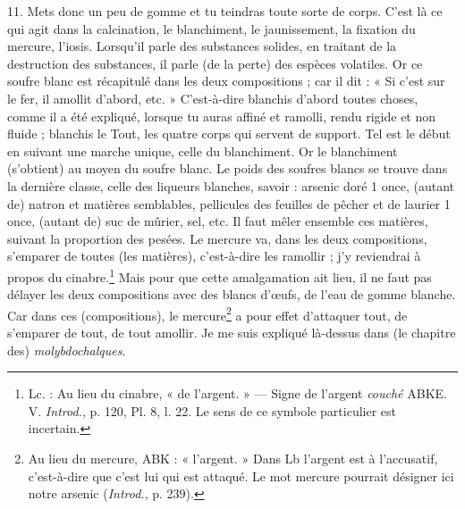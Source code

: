 \documentclass[a4paper, 11pt, oneside, polutonikogreek, french]{article}
\begin{document}
11. Mets donc un peu de gomme et tu teindras toute sorte de corps. C'est là ce qui agit dans la calcination, le blanchiment, le jaunissement, la fixation du mercure, l'iosis. Lorsqu'il parle des substances solides, en traitant de la destruction des substances, il parle (de la perte) des espèces volatiles. Or ce soufre blanc est récapitulé dans les deux compositions ; car il dit : « Si c'est sur le fer, il amollit d'abord, etc. » C'est-à-dire blanchis d'abord toutes choses, comme il a été expliqué, lorsque tu auras affiné et ramolli, rendu rigide et non fluide ; blanchis le Tout, les quatre corps qui servent de support. Tel est le début en suivant une marche unique, celle du blanchiment. Or le blanchiment (s'obtient) au moyen du soufre blanc. Le poids des soufres blancs se trouve dans la dernière classe, celle des liqueurs blanches, savoir : arsenic doré 1 once, (autant de) natron et matières semblables, pellicules des feuilles de pêcher et de laurier 1 once, (autant de) suc de mûrier, sel, etc. Il faut mêler ensemble ces matières, suivant la proportion des pesées. Le mercure va, dans les deux compositions, s'emparer de toutes (les matières), c'est-à-dire les ramollir ; j'y reviendrai à propos du cinabre.\footnote{Lc. : Au lieu du cinabre, « de l'argent. » --- Signe de l'argent \emph{couché} ABKE. V. \emph{Introd.}, p. 120, Pl. 8, l. 22. Le sens de ce symbole particulier est incertain.} Mais pour que cette amalgamation ait lieu, il ne faut pas délayer les deux compositions avec des blancs d'œufs, de l'eau de gomme blanche. Car dans ces (compositions), le mercure\footnote{Au lieu du mercure, ABK : « l'argent. » Dans Lb l'argent est à l'accusatif, c'est-à-dire que c'est lui qui est attaqué. Le mot mercure pourrait désigner ici notre arsenic (\emph{Introd.}, p. 239).} a pour effet d'attaquer tout, de s'emparer de tout, de tout amollir. Je me suis expliqué là-dessus dans (le chapitre des) \emph{molybdochalques}.
\end{document}
